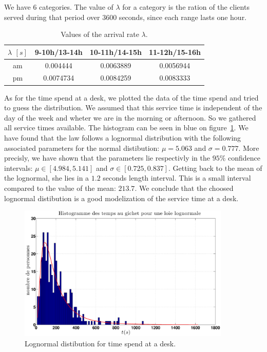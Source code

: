 \documentclass[12pt,a4paper,notitlepage]{report}
\begin{document}
\newpage
We have $6$ categories. The value of $\lambda$ for a category is the ration of the clients served during that period over $3600$ seconds, since each range lasts one hour.

\begin{table}[!hbt]
\centering
\begin{tabular}{|c|c|c|c|}
\hline 
$\lambda$ $\left[s\right]$ & 9-10h/13-14h & 10-11h/14-15h & 11-12h/15-16h \\ 
\hline 
am & 0.004444 & 0.0063889 & 0.0056944 \\ 
\hline 
pm & 0.0074734 & 0.0084259 & 0.0083333 \\ 
\hline 
\end{tabular}
\caption{Values of the arrival rate $\lambda$.} 
\end{table}

As for the time spend at a desk, we plotted the data of the time spend and tried to guess the distribution. We assumed that this service time is independent of the day of the week and wheter we are in the morning or afternoon. So we gathered all service times available. The histogram can be seen in blue on figure~\ref{lognormal}. We have found that the law follows a lognormal distribution with the following associated parameters for the normal distibution: $\mu= 5.063$ and $\sigma= 0.777$. More precisly, we have shown that the parameters lie respectivly in the $95 \% $ confidence intervals: $\mu \in [ 4.984 , 5.141 ]$ and $\sigma \in [ 0.725 , 0.837]$. Getting back to the mean of the lognormal, she lies in a $1.2$ seconds length interval. This is a small interval compared to the value of the mean: $ 213.7$. We conclude that the choosed lognormal distibution is a good modelization of the service time at a desk.

\begin{figure}[!h]
\centering
\includegraphics[width = 0.9\textwidth]{../matlab/eps/hist_lognormal.eps}
\caption{Lognormal distibution for time spend at a desk.}
\label{lognormal}
\end{figure}
\end{document}

